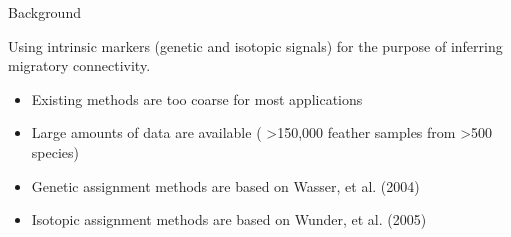 \documentclass[11pt,ignorenonframetext,]{beamer}
\providecommand{\tightlist}{%
  \setlength{\itemsep}{0pt}\setlength{\parskip}{0pt}}
\begin{document}
\begin{frame}{Background}
\protect\hypertarget{background}{}

Using intrinsic markers (genetic and isotopic signals) for the purpose
of inferring migratory connectivity.

\vspace{2mm}

\begin{itemize}
\tightlist
\item
  Existing methods are too coarse for most applications
\end{itemize}

\vspace{2mm}

\begin{itemize}
\tightlist
\item
  Large amounts of data are available ( \textgreater 150,000 feather
  samples from \textgreater 500 species)
\end{itemize}

\vspace{2mm}

\begin{itemize}
\tightlist
\item
  Genetic assignment methods are based on Wasser, et al. (2004)
\end{itemize}

\vspace{2mm}

\begin{itemize}
\tightlist
\item
  Isotopic assignment methods are based on Wunder, et al. (2005)
\end{itemize}

\end{frame}
\end{document}
